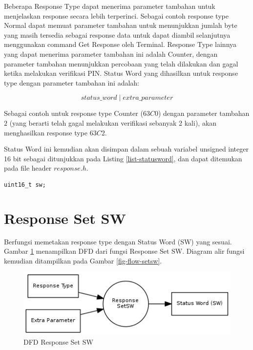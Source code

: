 Beberapa Response Type dapat menerima parameter tambahan untuk menjelaskan response secara lebih terperinci. Sebagai contoh response type Normal dapat memuat parameter tambahan untuk menunjukkan jumlah byte yang masih tersedia sebagai response data untuk dapat diambil selanjutnya menggunakan command Get Response oleh Terminal. Response Type lainnya yang dapat menerima parameter tambahan ini adalah Counter, dengan parameter tambahan menunjukkan percobaan yang telah dilakukan dan gagal ketika melakukan verifikasi PIN. Status Word yang dihasilkan untuk response type dengan parameter tambahan ini adalah:

\begin{equation}
status\_word \mathrel{|} extra\_parameter
\end{equation}

Sebagai contoh untuk response type Counter ($63C0$) dengan parameter tambahan $2$ (yang berarti telah gagal melakukan verifikasi sebanyak 2 kali), akan menghasilkan response type $63C2$.

Status Word ini kemudian akan disimpan dalam sebuah variabel unsigned integer 16 bit sebagai ditunjukkan pada Listing \ref{list-statusword}, dan dapat ditemukan pada file header $response.h$.

\begin{lstlisting}[caption={Deklarasi variabel status word}, label={list-statusword}]
uint16_t sw;
\end{lstlisting}

\section{Response Set SW}
\label{sec_setsw}

Berfungsi memetakan response type dengan Status Word (SW) yang sesuai. Gambar \ref{fig-dfd-setsw} menampilkan DFD dari fungsi Response Set SW. Diagram alir fungsi kemudian ditampilkan pada Gambar \ref{fig-flow-setsw}. 

\begin{figure}[h]
\centering
\includegraphics[scale=0.75]{image/response/dfd_setsw.png}
\caption{DFD Response Set SW}
\label{fig-dfd-setsw}
\end{figure}

